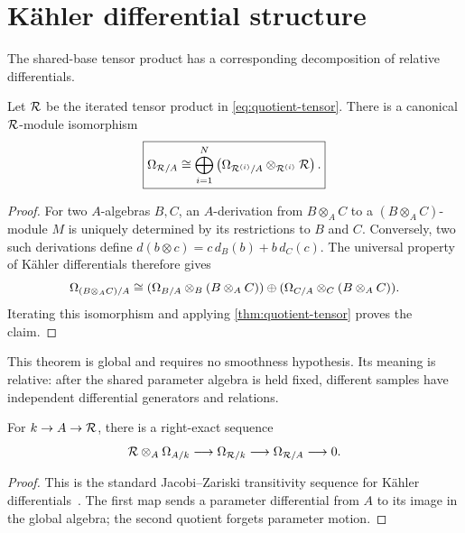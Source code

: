 \section{K\"ahler differential structure}
\label{sec:kahler}

The shared-base tensor product has a corresponding decomposition of relative
differentials.

\begin{theorem}
\label{thm:relative-differentials}
Let \(\mathcal{R}\) be the iterated tensor product in
\cref{eq:quotient-tensor}.  There is a canonical \(\mathcal{R}\)-module isomorphism
\begin{equation}
  \boxed{
  \Omega_{\mathcal{R}/A}\cong
  \bigoplus_{i=1}^{N}
  \left(
    \Omega_{\mathcal{R}^{(i)}/A}
    \otimes_{\mathcal{R}^{(i)}}\mathcal{R}
  \right).}
  \label{eq:relative-differential-decomposition}
\end{equation}
\end{theorem}

\begin{proof}
For two \(A\)-algebras \(B,C\), an \(A\)-derivation from \(B\otimes_A C\) to a
\((B\otimes_A C)\)-module \(M\) is uniquely determined by its restrictions to
\(B\) and \(C\).  Conversely, two such derivations define
\(d(b\otimes c)=c\,d_B(b)+b\,d_C(c)\).  The universal property of K\"ahler
differentials therefore gives
\begin{equation}
 \Omega_{(B\otimes_A C)/A}
 \cong
 (\Omega_{B/A}\otimes_B(B\otimes_A C))
 \oplus
 (\Omega_{C/A}\otimes_C(B\otimes_A C)).
\end{equation}
Iterating this isomorphism and applying \cref{thm:quotient-tensor} proves the
claim.
\end{proof}

This theorem is global and requires no smoothness hypothesis.  Its meaning is
relative: after the shared parameter algebra is held fixed, different samples
have independent differential generators and relations.

\begin{proposition}
\label{prop:transitivity}
For \(k\to A\to\mathcal{R}\), there is a right-exact sequence
\begin{equation}
  \mathcal{R}\otimes_A\Omega_{A/k}
  \longrightarrow\Omega_{\mathcal{R}/k}
  \longrightarrow\Omega_{\mathcal{R}/A}
  \longrightarrow0.
  \label{eq:global-transitivity}
\end{equation}
\end{proposition}

\begin{proof}
This is the standard Jacobi--Zariski transitivity sequence for K\"ahler
differentials~\cite{StacksDifferentials}.  The first map sends a parameter
differential from \(A\) to its image in the global algebra; the second quotient
forgets parameter motion.
\end{proof}

